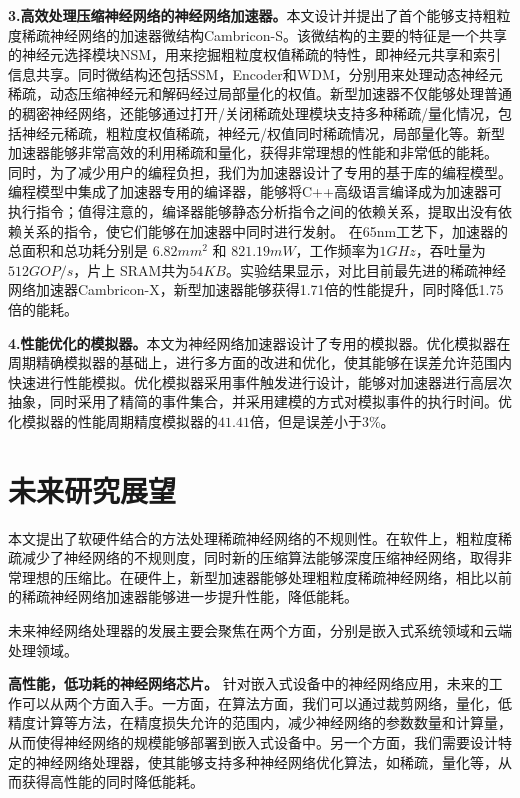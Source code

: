 \textbf{3.高效处理压缩神经网络的神经网络加速器。}本文设计并提出了首个能够支持粗粒度稀疏神经网络的加速器微结构Cambricon-S。该微结构的主要的特征是一个共享的神经元选择模块NSM，用来挖掘粗粒度权值稀疏的特性，即神经元共享和索引信息共享。同时微结构还包括SSM，Encoder和WDM，分别用来处理动态神经元稀疏，动态压缩神经元和解码经过局部量化的权值。新型加速器不仅能够处理普通的稠密神经网络，还能够通过打开/关闭稀疏处理模块支持多种稀疏/量化情况，包括神经元稀疏，粗粒度权值稀疏，神经元/权值同时稀疏情况，局部量化等。新型加速器能够非常高效的利用稀疏和量化，获得非常理想的性能和非常低的能耗。
同时，为了减少用户的编程负担，我们为加速器设计了专用的基于库的编程模型。编程模型中集成了加速器专用的编译器，能够将C++高级语言编译成为加速器可执行指令；值得注意的，编译器能够静态分析指令之间的依赖关系，提取出没有依赖关系的指令，使它们能够在加速器中同时进行发射。
在65nm工艺下，加速器的总面积和总功耗分别是 $6.82mm^2$ 和 $821.19mW$，工作频率为$1GHz$，吞吐量为$512GOP/s$，片上 SRAM共为$54KB$。实验结果显示，对比目前最先进的稀疏神经网络加速器Cambricon-X，新型加速器能够获得1.71倍的性能提升，同时降低1.75倍的能耗。

\textbf{4.性能优化的模拟器。}本文为神经网络加速器设计了专用的模拟器。优化模拟器在周期精确模拟器的基础上，进行多方面的改进和优化，使其能够在误差允许范围内快速进行性能模拟。优化模拟器采用事件触发进行设计，能够对加速器进行高层次抽象，同时采用了精简的事件集合，并采用建模的方式对模拟事件的执行时间。优化模拟器的性能周期精度模拟器的$41.41$倍，但是误差小于$3\%$。

\section{未来研究展望}

本文提出了软硬件结合的方法处理稀疏神经网络的不规则性。在软件上，粗粒度稀疏减少了神经网络的不规则度，同时新的压缩算法能够深度压缩神经网络，取得非常理想的压缩比。在硬件上，新型加速器能够处理粗粒度稀疏神经网络，相比以前的稀疏神经网络加速器能够进一步提升性能，降低能耗。

未来神经网络处理器的发展主要会聚焦在两个方面，分别是嵌入式系统领域和云端处理领域。

\textbf{高性能，低功耗的神经网络芯片。}
针对嵌入式设备中的神经网络应用，未来的工作可以从两个方面入手。一方面，在算法方面，我们可以通过裁剪网络，量化，低精度计算等方法，在精度损失允许的范围内，减少神经网络的参数数量和计算量，从而使得神经网络的规模能够部署到嵌入式设备中。另一个方面，我们需要设计特定的神经网络处理器，使其能够支持多种神经网络优化算法，如稀疏，量化等，从而获得高性能的同时降低能耗。

